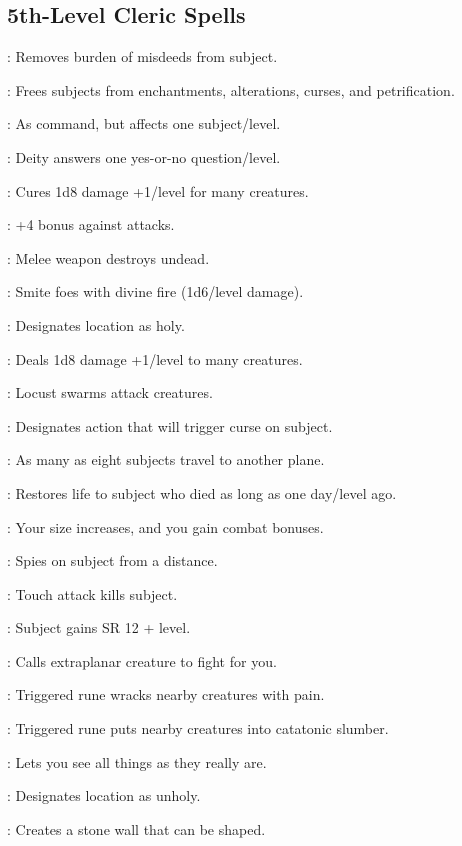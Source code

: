 \begin{multicols}{2}
\subsection{5th-Level Cleric Spells}
\begin{description*}
\item[\linkspell{Atonement}:] Removes burden of misdeeds from subject.
\item[\linkspell{Break Enchantment}:] Frees subjects from enchantments, alterations, curses, and petrification.
\item[\linkspell{Command, Greater}:] As command, but affects one subject/level.
\item[\linkspell{Commune}:] Deity answers one yes-or-no question/level.
\item[\linkspell{Cure Light Wounds, Mass}:] Cures 1d8 damage +1/level for many creatures.
\item[\linkspell{Dispel Chaos/Evil/Good/Law}:] +4 bonus against attacks.
\item[\linkspell{Disrupting Weapon}:] Melee weapon destroys undead.
\item[\linkspell{Flame Strike}:] Smite foes with divine fire (1d6/level damage).
\item[\linkspell{Hallow}:] Designates location as holy.
\item[\linkspell{Inflict Light Wounds, Mass}:] Deals 1d8 damage +1/level to many creatures.
\item[\linkspell{Insect Plague}:] Locust swarms attack creatures.
\item[\linkspell{Mark of Justice}:] Designates action that will trigger curse on subject.
\item[\linkspell{Plane Shift}:] As many as eight subjects travel to another plane.
\item[\linkspell{Raise Dead}:] Restores life to subject who died as long as one day/level ago.
\item[\linkspell{Righteous Might}:] Your size increases, and you gain combat bonuses.
\item[\linkspell{Scrying}:] Spies on subject from a distance.
\item[\linkspell{Slay Living}:] Touch attack kills subject.
\item[\linkspell{Spell Resistance}:] Subject gains SR 12 + level.
\item[\linkspell{Summon Monster V}:] Calls extraplanar creature to fight for you.
\item[\linkspell{Symbol of Pain}:] Triggered rune wracks nearby creatures with pain.
\item[\linkspell{Symbol of Sleep}:] Triggered rune puts nearby creatures into catatonic slumber.
\item[\linkspell{True Seeing}:] Lets you see all things as they really are.
\item[\linkspell{Unhallow}:] Designates location as unholy.
\item[\linkspell{Wall of Stone}:] Creates a stone wall that can be shaped.
\end{description*}


\end{multicols}
